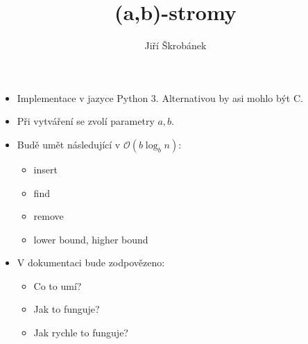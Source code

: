 \documentclass[czech]{article}
\date{}
\title{(a,b)-stromy}
\author{Jiří Škrobánek}
\begin{document}
	\maketitle

\begin{itemize}
\item Implementace v jazyce Python 3. Alternativou by asi mohlo být C.
\item Při vytváření se zvolí parametry $a,b$.
\item Budě umět následující v $\mathcal{O}(b \log_b n)$:
	\begin{itemize}
		\item insert
		\item find
		\item remove
		\item lower bound, higher bound
	\end{itemize}
\item V dokumentaci bude zodpovězeno:
	\begin{itemize}
		\item Co to umí?
		\item Jak to funguje?
		\item Jak rychle to funguje?
	\end{itemize}
\end{itemize}
\end{document}
